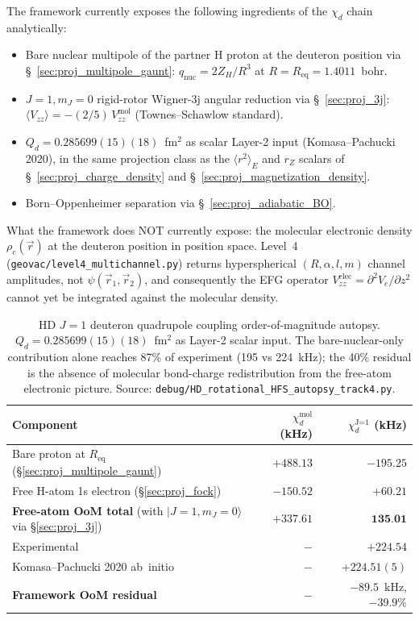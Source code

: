 \documentclass[11pt]{article}
\begin{document}
The framework currently exposes the following ingredients of the
$\chi_d$ chain analytically:
\begin{itemize}\setlength\itemsep{0pt}
\item Bare nuclear multipole of the partner H proton at the
deuteron position via \S~\ref{sec:proj_multipole_gaunt}:
$q_\text{nuc} = 2 Z_H / R^3$ at $R = R_\text{eq} = 1.4011$~bohr.
\item $J=1, m_J=0$ rigid-rotor Wigner-3j angular reduction via
\S~\ref{sec:proj_3j}: $\langle V_{zz}\rangle = -(2/5)\,V_{zz}^\text{mol}$
(Townes--Schawlow standard).
\item $Q_d = 0.285699(15)(18)$~fm$^2$ as scalar Layer-2 input
(Komasa--Pachucki 2020), in the same projection class as the
$\langle r^2\rangle_E$ and $r_Z$ scalars of \S~\ref{sec:proj_charge_density}
and \S~\ref{sec:proj_magnetization_density}.
\item Born--Oppenheimer separation via \S~\ref{sec:proj_adiabatic_BO}.
\end{itemize}
What the framework does NOT currently expose: the molecular
electronic density $\rho_e(\vec{r})$ at the deuteron position
in position space.  Level~4 (\texttt{geovac/level4\_multichannel.py})
returns hyperspherical $(R, \alpha, l, m)$ channel amplitudes,
not $\psi(\vec{r}_1, \vec{r}_2)$, and consequently the EFG
operator $V_{zz}^\text{elec} = \partial^2 V_e/\partial z^2$ cannot
yet be integrated against the molecular density.

\begin{table}[h]
\centering\small
\begin{tabular}{p{5.5cm} r r}
\toprule
Component & $\chi_d^\text{mol}$ (kHz) & $\chi_d^\text{J=1}$ (kHz) \\
\midrule
Bare proton at $R_\text{eq}$ (\S\ref{sec:proj_multipole_gaunt}) &
$+488.13$ & $-195.25$ \\
Free H-atom 1s electron (\S\ref{sec:proj_fock}) &
$-150.52$ & $+60.21$ \\
\midrule
\textbf{Free-atom OoM total} (with $|J=1, m_J=0\rangle$ via
\S\ref{sec:proj_3j}) & $+337.61$ & $\textbf{135.01}$ \\
\midrule
Experimental & $-$ & $+224.54$ \\
Komasa--Pachucki 2020 ab~initio & $-$ & $+224.51(5)$ \\
\textbf{Framework OoM residual} & $-$ &
$\mathbf{-89.5}$~kHz, $\mathbf{-39.9\%}$ \\
\bottomrule
\end{tabular}
\caption{HD $J=1$ deuteron quadrupole coupling order-of-magnitude
autopsy.  $Q_d = 0.285699(15)(18)$~fm$^2$ as Layer-2 scalar input.
The bare-nuclear-only contribution alone reaches 87\% of experiment
(195 vs 224~kHz); the 40\% residual is the absence of molecular
bond-charge redistribution from the free-atom electronic picture.
Source: \texttt{debug/HD\_rotational\_HFS\_autopsy\_track4.py}.}
\label{tab:autopsy_HD_rotational_HFS}
\end{table}
\end{document}
